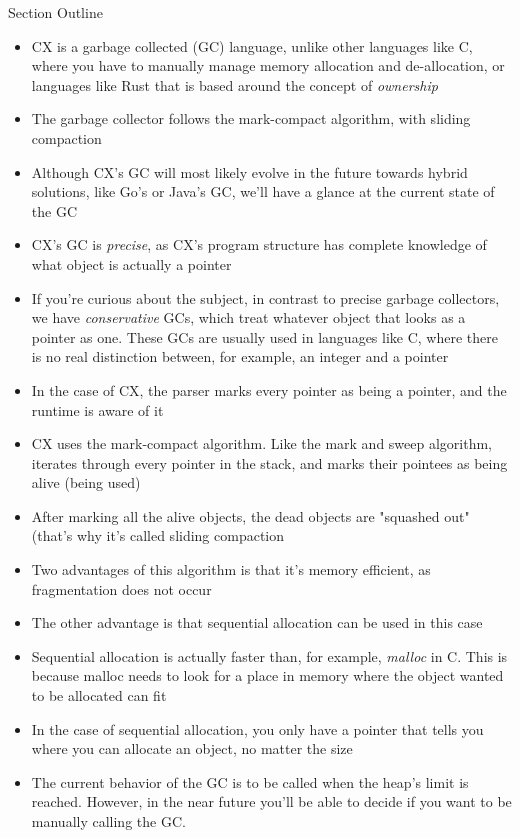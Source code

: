 \documentclass[11pt,fleqn,openany]{book} %
\begin{document}
\begin{remark}
Section Outline
    \begin{itemize}
    \item CX is a garbage collected (GC) language, unlike other languages like C, where you have to manually manage memory allocation and de-allocation, or languages like Rust that is based around the concept of \textit{ownership}
    \item The garbage collector follows the mark-compact algorithm, with sliding compaction
    \item Although CX's GC will most likely evolve in the future towards hybrid solutions, like Go's or Java's GC, we'll have a glance at the current state of the GC
    \item CX's GC is \textit{precise}, as CX's program structure has complete knowledge of what object is actually a pointer
    \item If you're curious about the subject, in contrast to precise garbage collectors, we have \textit{conservative} GCs, which treat whatever object that looks as a pointer as one. These GCs are usually used in languages like C, where there is no real distinction between, for example, an integer and a pointer
    \item In the case of CX, the parser marks every pointer as being a pointer, and the runtime is aware of it
    \item CX uses the mark-compact algorithm. Like the mark and sweep algorithm, iterates through every pointer in the stack, and marks their pointees as being alive (being used)
    \item After marking all the alive objects, the dead objects are "squashed out" (that's why it's called sliding compaction
    \item Two advantages of this algorithm is that it's memory efficient, as fragmentation does not occur
    \item The other advantage is that sequential allocation can be used in this case
    \item Sequential allocation is actually faster than, for example, \textit{malloc} in C. This is because malloc needs to look for a place in memory where the object wanted to be allocated can fit
    \item In the case of sequential allocation, you only have a pointer that tells you where you can allocate an object, no matter the size
    \item The current behavior of the GC is to be called when the heap's limit is reached. However, in the near future you'll be able to decide if you want to be manually calling the GC.
    \end{itemize}
\end{remark}
\end{document}
